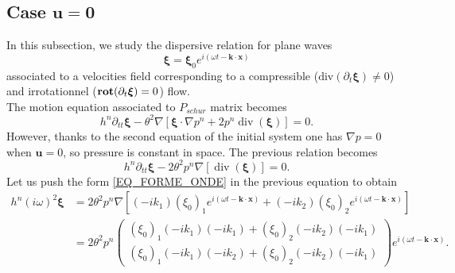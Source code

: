 \documentclass[a4paper, 11pt]{article}
\begin{document}
\subsection{Case $\boldsymbol{u}=\boldsymbol{0}$}
In this subsection, we study the dispersive relation for plane waves \begin{equation}
\boldsymbol{\xi}=\boldsymbol{\xi}_0e^{i(\omega t-\boldsymbol{k}\cdot \boldsymbol{x})}
\label{EQ_FORME_ONDE}
\end{equation}
associated to a velocities field corresponding to a compressible ($\text{div}(\partial_t\boldsymbol{\xi})\neq 0$) and irrotationnel ($\text{\textbf{rot}}(\partial_t\boldsymbol{\xi})=0$) flow. \\
The motion equation associated to $P_{schur}$ matrix becomes
\begin{equation*}
h^n\partial_{tt} \boldsymbol{\xi}-\theta^2 \nabla\left[ \boldsymbol{\xi}\cdot \nabla p^n + 2p^n \operatorname{div}( \boldsymbol{\xi}) \right]=0.
\end{equation*}
However, thanks to the second equation of the initial system one has $\nabla p=0$ when $\boldsymbol{u}=0$, so pressure is constant in space.
The previous relation becomes
\begin{equation*}
h^n\partial_{tt} \boldsymbol{\xi}-2\theta^2 p^n \nabla\left[\operatorname{div}( \boldsymbol{\xi}) \right]=0.
\end{equation*}
Let us push the form \eqref{EQ_FORME_ONDE} in the previous equation to obtain
\begin{equation*}
\begin{split}
h^n(i\omega)^2\boldsymbol{\xi}&=2\theta^2 p^n \nabla \left[(-ik_1)(\xi_0)_1e^{i(\omega t-\boldsymbol{k}\cdot \boldsymbol{x})}+(-ik_2)(\xi_0)_2e^{i(\omega t-\boldsymbol{k}\cdot \boldsymbol{x})}\right]\\
&=2\theta^2p^n\begin{pmatrix}(\xi_0)_1(-ik_1)(-ik_1)+(\xi_0)_2(-ik_2)(-ik_1)\\(\xi_0)_1(-ik_1)(-ik_2)+(\xi_0)_2(-ik_2)(-ik_1)\end{pmatrix}e^{i(\omega t-\boldsymbol{k}\cdot \boldsymbol{x})}.
\end{split}
\end{equation*}
\end{document}
